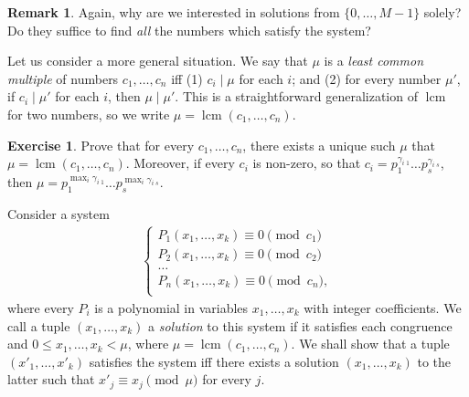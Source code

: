 \documentclass[12pt,notitlepage]{article}
\theoremstyle{plain}
\theoremstyle{definition}
\newtheorem{exc}[thm]{Exercise}
\newtheorem{rem}[thm]{Remark}
\theoremstyle{plain}
\newcommand{\1}{\mathbf{1}}
\newcommand{\0}{\mathbf{0}}
\newcommand{\dvd}{\mathop{\mid}}
\DeclareMathOperator{\lcm}{lcm}
\begin{document}
\begin{rem}
Again, why are we interested in solutions from $\{0, \ldots, M-1\}$ solely? Do they suffice to find \emph{all} the numbers which satisfy the system?

Let us consider a more general situation. We say that $\mu$ is a \emph{least common multiple} of numbers $c_1,\ldots,c_n$ iff (1) $c_i \dvd \mu$ for each $i$; and (2) for every number $\mu'$, if $c_i \dvd \mu'$ for each $i$, then $\mu \dvd \mu'$. This is a straightforward generalization of ${\lcm}$ for two numbers, so we write $\mu = \lcm(c_1,\ldots,c_n)$.

\begin{exc}\label{exc_n_lcm}
Prove that for every $c_1, \ldots, c_n$, there exists a unique such $\mu$ that $\mu = \lcm(c_1,\ldots,c_n)$. Moreover, if every $c_i$ is non-zero, so that $c_i = p^{\gamma_{i\; 1}}_1 \ldots p^{\gamma_{i\; s}}_s$, then $\mu = p^{\max_i \gamma_{i\; 1}}_1 \ldots p^{\max_i \gamma_{i\; s}}_s$.
\end{exc}

\noindent Consider a system 
\begin{equation*}
\begin{array}{l}
\begin{cases}
	 P_1(x_1, \ldots, x_k) \equiv 0 \pmod {c_1}\\
	 P_2(x_1, \ldots, x_k) \equiv 0 \pmod {c_2}\\
	 \ldots\\
	 P_n(x_1, \ldots, x_k) \equiv 0 \pmod {c_n},\\
\end{cases}
\end{array}
\end{equation*}
where every $P_i$ is a polynomial in variables $x_1,\ldots,x_k$ with integer coefficients. We call a tuple $(x_1, \ldots, x_k)$ a \emph{solution} to this system if it satisfies each congruence and $0 \leq x_1, \ldots, x_k < \mu$, where $\mu = \lcm(c_1, \ldots, c_n)$. We shall show that a tuple $(x'_1, \ldots, x'_k)$ satisfies the system iff there exists a solution $(x_1, \ldots, x_k)$ to the latter such that $x'_j \equiv x_j \pmod \mu$ for every $j$.


\end{rem}
\end{document}
